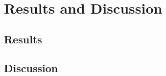 \chapter{Results and Discussion}
\label{ch:Results and Discussion}

\section{Results}

\section{Discussion}